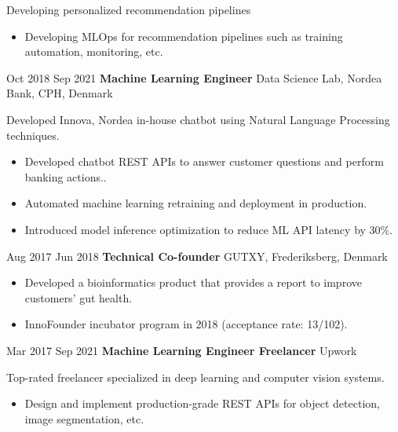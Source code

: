 \documentclass[11pt]{article} %
\begin{document}
{{	Developing personalized recommendation pipelines
	\begin{itemize}[itemsep=0pt]
		\item Developing MLOps for recommendation pipelines such as  training automation, monitoring, etc.
	\end{itemize}
}
\job
{Oct 2018 }{Sep 2021}
{\textbf{Machine Learning Engineer}}
{}
{Data Science Lab, Nordea Bank, CPH, Denmark}
{
 
    Developed Innova, Nordea in-house chatbot using Natural Language Processing techniques.
    \begin{itemize}[itemsep=0pt]
    	\item  Developed chatbot REST APIs to answer customer questions and perform banking actions..
    	\item  Automated machine learning retraining and deployment in production.
    	\item  Introduced model inference optimization to reduce ML API latency by 30\%.
    \end{itemize}
}

\job
{Aug 2017 }{Jun 2018}
{\textbf{Technical Co-founder}}
{}
{GUTXY, Frederiksberg, Denmark}
{
	\begin{itemize}[itemsep=0pt]
		\item Developed a bioinformatics product that provides a report to improve customers’ gut health.
		\item InnoFounder incubator program in 2018 (acceptance rate: 13/102).
	\end{itemize}
}

\job
{Mar 2017 }{Sep 2021}
{\textbf{Machine Learning Engineer Freelancer}}
{}
{Upwork}
{
	Top-rated freelancer specialized in deep learning and computer vision systems.
		\begin{itemize}[itemsep=0pt]
			\item Design and implement production-grade REST APIs for object detection, image segmentation, etc.
		\end{itemize}
}

}
\end{document}
